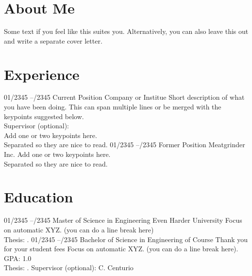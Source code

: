\documentclass[letterpaper,11pt]{dolce-cv} %
\begin{document}
	\section{About Me}
	Some text if you feel like this suites you. Alternatively, you can also leave this out and write a separate cover letter.
	
	\vspace*{\baselineskip}
	\section{Experience}
	\begin{entrylist}
		\entry
		{01/2345 --/2345}
		{Current Position}
		{Company or Institue}
		{Short description of what you have been doing. This can span multiple lines or be merged with the keypoints suggested below.\\
		Supervisor (optional): \href{URL}{}\\
		Add one or two keypoints here.\\
		Separated so they are nice to read.}
		\entry
		{01/2345 --/2345}
		{Former Position}
		{Meatgrinder Inc.}
		{Add one or two keypoints here.\\
		Separated so they are nice to read.}
	\end{entrylist}
	
	\section{Education}
	\begin{entrylist}
		\entry
		{01/2345 --/2345}
		{Master of Science {\normalfont in Engineering Even Harder}}
		{University}
		{Focus on automatic XYZ. (you can do a line break here)\\
		Thesis: \papertitle{Title}{}.
		}
		\entry
		{01/2345 --/2345}
		{Bachelor of Science {\normalfont in Engineering of Course}}
		{Thank you for your student fees}
		{Focus on automatic XYZ. (you can do a line break here). GPA: 1.0\\
	     Thesis: \papertitle{De Bello Gallico}{}.
	     Supervisor (optional): C. Centurio
        }
	\end{entrylist}
\end{document}
